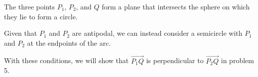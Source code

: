 \documentclass[../hw9]{subfiles}
\begin{document}
The three points $P_1$, $P_2$, and $Q$ form a plane that intersects the sphere on which they lie to form a circle.

Given that $P_1$ and $P_2$ are antipodal, we can instead consider a semicircle with $P_1$ and $P_2$ at the endpoints of the arc.

With these conditions, we will show that $\overrightarrow{P_1 Q}$ is perpendicular to $\overrightarrow{P_2 Q}$ in problem 5. 









\end{document}
